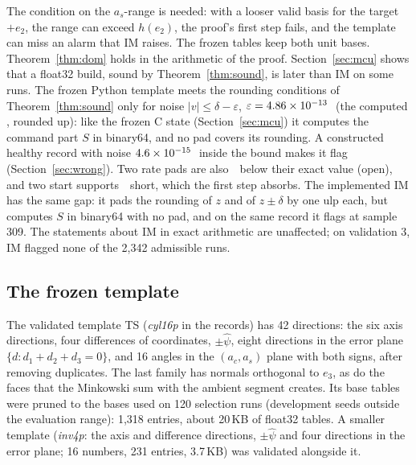 The condition on the $a_s$-range is needed: with a looser valid basis for the target $+e_2$, the range can exceed
$h(e_2)$, the proof's first step fails, and the template can miss an alarm that IM raises. The frozen tables keep both
unit bases. Theorem~\ref{thm:dom} holds in the arithmetic of the proof. Section~\ref{sec:mcu} shows that a float32
build, sound by Theorem~\ref{thm:sound}, is later than IM on some runs. The frozen Python template meets the rounding
conditions of Theorem~\ref{thm:sound} only for noise $|v|\le\delta-\varepsilon$, $\varepsilon = 4.86\times10^{-13}$\,\degC\ (the computed , rounded up):
like the frozen C state (Section~\ref{sec:mcu}) it computes the command part $S$ in binary64, and no pad covers its
rounding. A constructed healthy record with noise $4.6\times10^{-15}$\,\degC\ inside the bound makes it flag
(Section~\ref{sec:wrong}). Two rate pads are also \,\degC\ below their exact value (open), and two start
supports \,\degC\ short, which the first step absorbs. The implemented IM has the same gap: it pads the
rounding of $z$ and of $z\pm\delta$ by one ulp each, but computes $S$ in binary64 with no pad, and on the same record it
flags at sample 309. The statements about IM in exact arithmetic are unaffected; on validation 3, IM flagged none of the
2,342 admissible runs.

\subsection{The frozen template}\label{sec:frozen}

The validated template TS (\emph{cyl16p} in the records) has 42 directions: the six axis directions, four differences of
coordinates, $\pm\hat\psi$, eight directions in the error plane $\{d : d_1+d_2+d_3 = 0\}$, and 16 angles in the
$(a_c, a_s)$ plane with both signs, after removing duplicates. The last family has normals orthogonal to $e_3$, as do
the faces that the Minkowski sum with the ambient segment creates. Its base tables were pruned to the bases used on 120
selection runs (development seeds outside the evaluation range): 1,318 entries, about 20\,KB of float32 tables. A
smaller template (\emph{inv4p}: the axis and difference directions, $\pm\hat\psi$ and four directions in the error plane;
16 numbers, 231 entries, 3.7\,KB) was validated alongside it.

